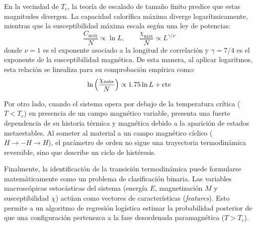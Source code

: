En la vecindad de $T_c$, la teoría de escalado de tamaño finito predice que estas magnitudes divergen. La capacidad calorífica máxima diverge logarítmicamente, mientras que la susceptibilidad máxima escala según una ley de potencias:
\begin{equation}
\frac{C_{\text{máx}}}{N} \propto \ln L, \qquad 
    \frac{\chi_{\text{máx}}}{N} \propto L^{\gamma/\nu}
    \label{eq:c}
\end{equation}
donde $\nu = 1$ es el exponente asociado a la longitud de correlación y $\gamma = 7/4$ es el exponente de la susceptibilidad magnética. De esta manera, al aplicar logaritmos, esta relación se linealiza para su comprobación empírica como:
\begin{equation}
    \ln\left(\frac{\chi_{\text{máx}}}{N}\right) \propto 1.75 \ln L + \rm cte
    \label{eq:ln_chi}
\end{equation}

Por otro lado, cuando el sistema opera por debajo de la temperatura crítica ($T < T_c$) en presencia de un campo magnético variable, presenta una fuerte dependencia de su historia térmica y magnética debido a la aparición de estados metaestables. Al someter al material a un campo magnético cíclico ($H \rightarrow -H \rightarrow H$), el parámetro de orden no sigue una trayectoria termodinámica reversible, sino que describe un ciclo de histéresis.

Finalmente, la identificación de la transición termodinámica puede formularse matemáticamente como un problema de clasificación binaria. Las variables macroscópicas estocásticas del sistema (energía $E$, magnetización $M$ y susceptibilidad $\chi$) actúan como vectores de características (\textit{features}). Esto permite a un algoritmo de regresión logística estimar la probabilidad posterior de que una configuración pertenezca a la fase desordenada paramagnética ($T > T_c$).